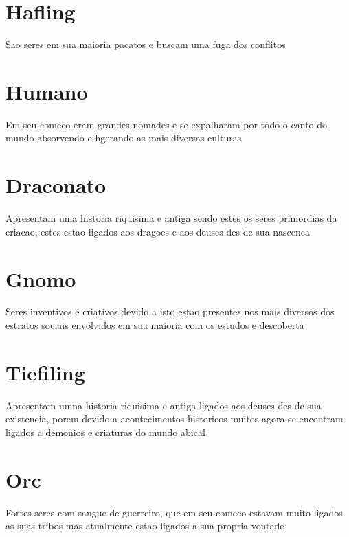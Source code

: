 \documentclass{book}
\begin{document}
\section{Hafling}
Sao seres em sua maioria pacatos e buscam uma fuga dos conflitos

\section{Humano}
Em seu comeco eram grandes nomades e se expalharam por todo o canto do mundo absorvendo e
hgerando as mais diversas culturas 
\section{Draconato}
Apresentam uma historia riquisima e antiga sendo estes os seres primordias da criacao, estes
estao ligados aos dragoes e aos deuses des de sua nascenca 
\section{Gnomo}
Seres inventivos e criativos devido a isto estao presentes nos mais diversos dos estratos 
sociais envolvidos em sua maioria com os estudos e descoberta
\section{Tiefiling}
Apresentam umna historia riquisima e antiga ligados aos deuses des de sua existencia, porem 
devido a acontecimentos historicos muitos agora se encontram ligados a demonios e criaturas 
do mundo abical 
\section{Orc}
Fortes seres com sangue de guerreiro, que em seu comeco estavam muito ligados as suas tribos 
mas atualmente estao ligados a sua propria vontade 
\end{document}

